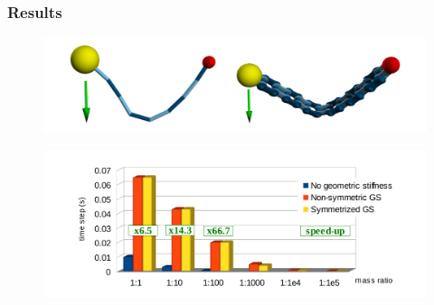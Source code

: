 \documentclass[serif,mathserif]{beamer}
\begin{document}

\begin{frame}
 \frametitle{Results}
 \begin{figure}
  \centering
  \includegraphics[scale=0.25]{img/cables.png}
 \end{figure}
 \begin{figure}
  \centering
  \includegraphics[scale=0.25]{img/statistics.png}
 \end{figure}
\end{frame}
\end{document}
